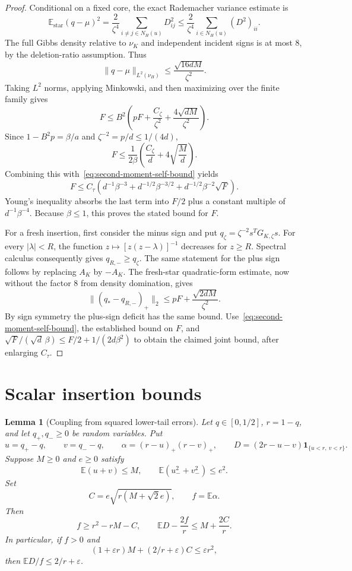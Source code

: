 \documentclass[11pt]{article}
\numberwithin{equation}{section}
\newtheorem{lemma}[theorem]{Lemma}
\begin{document}
\begin{proof}
Conditional on a fixed core, the exact Rademacher variance estimate
is
\[
 \mathbb E_{\mathrm{star}}(q-\mu)^2
 =\frac2{\zeta^4}\sum_{i\ne j\in N_H(u)}D_{ij}^2
 \le\frac2{\zeta^4}\sum_{i\in N_H(u)}(D^2)_{ii}.
\]
The full Gibbs density relative to $\nu_K$ and independent incident
signs is at most $8$, by the deletion-ratio assumption. Thus
\[
 \|q-\mu\|_{L^2(\nu_H)}
 \le\frac{\sqrt{16dM}}{\zeta^2}.
\]
Taking $L^2$ norms, applying Minkowski, and then maximizing over the
finite family gives
\[
 F\le B^2\left(pF+\frac{C_\zeta}{\zeta^2}
                         +\frac{4\sqrt{dM}}{\zeta^2}\right).
\]
Since $1-B^2p=\beta/a$ and $\zeta^{-2}=p/d\le1/(4d)$,
\begin{equation}\label{eq:cavity-l2-contraction}
 F\le\frac1{2\beta}
       \left(\frac{C_\zeta}{d}+4\sqrt{\frac Md}\right).
\end{equation}
Combining this with~\eqref{eq:second-moment-self-bound} yields
\[
 F\le C_\tau\left(
       d^{-1}\beta^{-3}
       +d^{-1/2}\beta^{-3/2}
       +d^{-1/2}\beta^{-2}\sqrt F\right).
\]
Young's inequality absorbs the last term into $F/2$ plus a constant
multiple of $d^{-1}\beta^{-4}$. Because $\beta\le1$, this proves
the stated bound for $F$.

For a fresh insertion, first consider the minus sign and put
$q_\zeta=\zeta^{-2}s^TG_{K,\zeta}s$.
For every $|\lambda|<R$, the function
$z\mapsto[z(z-\lambda)]^{-1}$ decreases for $z\ge R$.
Spectral calculus consequently gives $q_{R,-}\ge q_\zeta$.
The same statement for the plus sign follows by replacing $A_K$ by
$-A_K$. The fresh-star quadratic-form estimate, now without the
factor $8$ from density domination, gives
\[
 \|(q_*-q_{R,-})_+\|_2
 \le pF+\frac{\sqrt{2dM}}{\zeta^2}.
\]
By sign symmetry the plus-sign deficit has the same bound.
Use~\eqref{eq:second-moment-self-bound}, the established bound on $F$,
and $\sqrt F/(\sqrt d\,\beta)\le F/2+1/(2d\beta^2)$ to obtain the
claimed joint bound, after enlarging $C_\tau$.
\end{proof}


\section{Scalar insertion bounds}
\begin{lemma}[Coupling from squared lower-tail errors]
Let $q\in[0,1/2]$, $r=1-q$, and let $q_+,q_-\ge0$ be
random variables. Put
\[
 u=q_+-q,\qquad v=q_--q,\qquad
 \alpha=(r-u)_+(r-v)_+,
 \qquad D=(2r-u-v)\mathbf1_{\{u<r,\ v<r\}}.
\]
Suppose $M\ge0$ and $e\ge0$ satisfy
\[
 \mathbb E(u+v)\le M,
 \qquad \mathbb E(u_-^2+v_-^2)\le e^2.
\]
Set
\[
 C=e\sqrt{r(M+\sqrt2e)},\qquad f=\mathbb E\alpha.
\]
Then
\[
 f\ge r^2-rM-C,
 \qquad \mathbb E D-\frac{2f}{r}\le M+\frac{2C}{r}.
\]
In particular, if $f>0$ and
\begin{equation}\label{eq:second-order-scalar-budget}
 (1+\varepsilon r)M+(2/r+\varepsilon)C
 \le\varepsilon r^2,
\end{equation}
then $\mathbb E D/f\le2/r+\varepsilon$.
\end{lemma}
\end{document}
